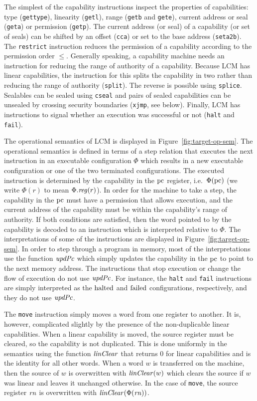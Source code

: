 \documentclass[acmsmall,screen]{acmart}\settopmatter{}
\renewcommand{\updPcAddr}[1]{\plainfun{updPc}{#1}}
\renewcommand{\linCons}[1]{\plainfun{linClear}{#1}}
\newcommand{\trgcm}{\textsc{LCM}}
\begin{document}
The simplest of the capability instructions inspect the properties of capabilities: type (\texttt{gettype}), linearity (\texttt{getl}), range (\texttt{getb} and \texttt{gete}), current address or seal (\texttt{geta}) or permission (\texttt{getp}).
The current address (or seal) of a capability (or set of seals) can be shifted by an offset (\texttt{cca}) or set to the base address (\texttt{seta2b}).
The \texttt{restrict} instruction reduces the permission of a capability according to the permission order $\le$.
Generally speaking, a capability machine needs an instruction for reducing the range of authority of a capability.
Because \trgcm{} has linear capabilities, the instruction for this splits the capability in two rather than reducing the range of authority (\texttt{split}).
The reverse is possible using \texttt{splice}.
Sealables can be sealed using \texttt{cseal} and pairs of sealed capabilities can be unsealed by crossing security boundaries (\texttt{xjmp}, see below).
Finally, \trgcm{} has instructions to signal whether an execution was successful or not (\texttt{halt} and \texttt{fail}).

The operational semantics of \trgcm{} is displayed in Figure~\ref{fig:target-op-sem}.
The operational semantics is defined in terms of a step relation that executes the next instruction in an executable configuration $\Phi$ which results in a new executable configuration or one of the two terminated configurations.
The executed instruction is determined by the capability in the $\mathrm{pc}$ register, i.e.\ $\Phi(\mathrm{pc})$ (we write $\Phi(r)$ to mean $\Phi.\reg(r)$).
In order for the machine to take a step, the capability in the $\mathrm{pc}$ must have a permission that allows execution, and the current address of the capability must be within the capability's range of authority.
If both conditions are satisfied, then the word pointed to by the capability is decoded to an instruction which is interpreted relative to $\Phi$.
The interpretations of some of the instructions are displayed in Figure~\ref{fig:target-op-sem}.
In order to step through a program in memory, most of the interpretations use the function $\updPcAddr{}$ which simply updates the capability in the $\mathrm{pc}$ to point to the next memory address.
The instructions that stop execution or change the flow of execution do not use $\updPcAddr{}$.
For instance, the \texttt{halt} and \texttt{fail} instructions are simply interpreted as the $\mathrm{halted}$ and $\mathrm{failed}$ configurations, respectively, and they do not use $\updPcAddr{}$.

The \texttt{move} instruction simply moves a word from one register to another.
It is, however, complicated slightly by the presence of the non-duplicable linear capabilities.
When a linear capability is moved, the source register must be cleared, so the capability is not duplicated.
This is done uniformly in the semantics using the function $\linCons{}$ that returns $0$ for linear capabilities and is the identity for all other words.
When a word $w$ is transferred on the machine, then the source of $w$ is overwritten with $\linCons{w}$ which clears the source if $w$ was linear and leaves it unchanged otherwise.
In the case of \texttt{move}, the source register $\mathit{rn}$ is overwritten with $\linCons{\Phi(\rn)}$.
\end{document}
